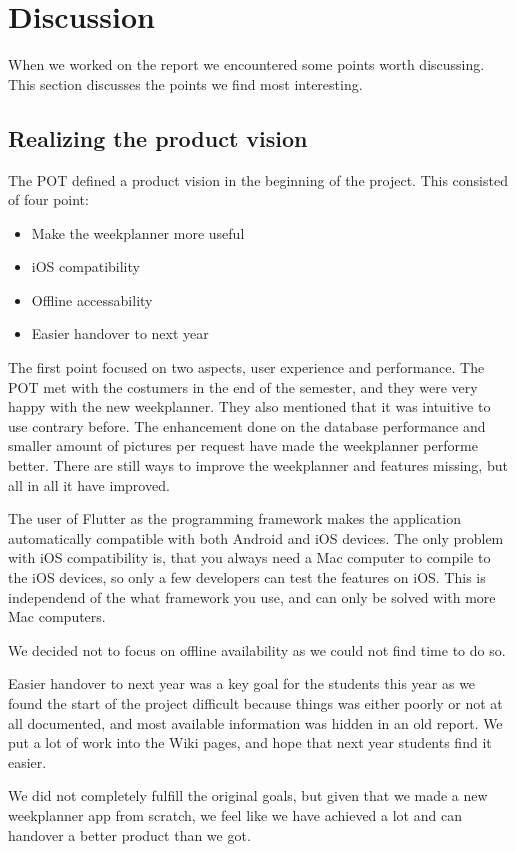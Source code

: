 \section{Discussion}

When we worked on the report we encountered some points worth discussing. This section discusses the points we find most interesting. 

\subsection{Realizing the product vision}
The \gls{POT} defined a product vision in the beginning of the project. This consisted of four point:
\begin{itemize}
    \item Make the weekplanner more useful
    \item iOS compatibility
    \item Offline accessability
    \item Easier handover to next year
\end{itemize}
The first point focused on two aspects, user experience and performance. The \gls{POT} met with the costumers in the end of the semester, and they were very happy with the new weekplanner. They also mentioned that it was intuitive to use contrary before. The enhancement done on the database performance and smaller amount of pictures per request have made the weekplanner performe better. There are still ways to improve the weekplanner and features missing, but all in all it have improved.

The user of Flutter as the programming framework makes the application automatically compatible with both Android and iOS devices. The only problem with iOS compatibility is, that you always need a Mac computer to compile to the iOS devices, so only a few developers can test the features on iOS. This is independend of the what framework you use, and can only be solved with more Mac computers.

We decided not to focus on offline availability as we could not find time to do so.

Easier handover to next year was a key goal for the students this year as we found the start of the project difficult because things was either poorly or not at all documented, and most available information was hidden in an old report. We put a lot of work into the Wiki pages, and hope that next year students find it easier.

We did not completely fulfill the original goals, but given that we made a new weekplanner app from scratch, we feel like we have achieved a lot and can handover a better product than we got.

